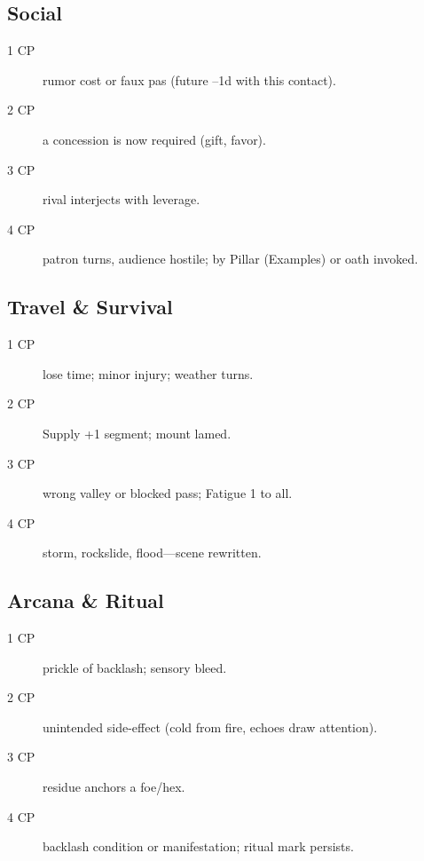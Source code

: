 \subsection{Social}

\begin{description}
\item[1 CP] rumor cost or faux pas (future --1d with this contact).
\item[2 CP] a concession is now required (gift, favor).
\item[3 CP] rival interjects with leverage.
\item[4 CP] patron turns, audience hostile; by Pillar (Examples) or oath invoked.
\end{description}

\subsection{Travel \& Survival}

\begin{description}
\item[1 CP] lose time; minor injury; weather turns.
\item[2 CP] Supply +1 segment; mount lamed.
\item[3 CP] wrong valley or blocked pass; Fatigue 1 to all.
\item[4 CP] storm, rockslide, flood---scene rewritten.
\end{description}

\subsection{Arcana \& Ritual}

\begin{description}
\item[1 CP] prickle of backlash; sensory bleed.
\item[2 CP] unintended side-effect (cold from fire, echoes draw attention).
\item[3 CP] residue anchors a foe/hex.
\item[4 CP] backlash condition or manifestation; ritual mark persists.
\end{description}

